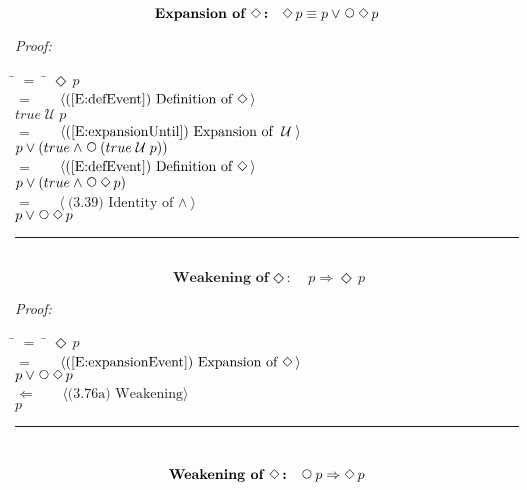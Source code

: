 \documentclass[fleqn, leqno]{article}
\newcommand{\lgap}{2pt} %
\newcommand{\mymathindent}{24pt} %
\newcommand{\Until}{\;\mathcal{U}\;}
\newcommand{\Next}{\;\,\text{\raisebox{3.5pt}{\circle{6}}}}
\newcommand{\Event}{\Diamond\,}
\newcommand{\myqed}{\hfill\rule[-.23ex]{1.2ex}{2.0ex}}
\newcommand{\Gll} {\langle} %
\newcommand{\Ggg} {\rangle} %
\newcommand{\Hint}[1] {\ \ \ $\Gll \mbox{#1} \Ggg$ } %
\begin{document}
\begin{equation}\label{E:expansionEvent}
\textbf{Expansion of $\Event$:}\quad \Event p \equiv p \lor \Next\Event p
\end{equation}

\emph{Proof:}
\begin{tabbing}
\hspace{\mymathindent} \= $= \;$ \= \kill
\> \> $\Event p$\\[\lgap]
\> $=$ \> \Hint{(\ref{E:defEvent}) Definition of $\Event$}\\[\lgap]
\> \> $true \Until p$\\[\lgap]
\> $=$ \> \Hint{(\ref{E:expansionUntil}) Expansion of $\Until$}\\[\lgap]
\> \> $p \lor (true \land \Next(true \Until p))$\\[\lgap]
\> $=$ \> \Hint{(\ref{E:defEvent}) Definition of $\Event$}\\[\lgap]
\> \> $p \lor (true \land \Next\Event p)$\\[\lgap]
\> $=$ \> \Hint{(3.39) Identity of $\land$}\\[\lgap]
\> \> $p \lor \Next\Event p$\\[\lgap]
\end{tabbing}
\myqed\\[\lgap]

\begin{equation}\label{E:impEvent}
\textbf{Weakening of $\Event$:}\quad p \Rightarrow \Event p
\end{equation}

\emph{Proof:}
\begin{tabbing}
\hspace{\mymathindent} \= $= \;$ \= \kill
\> \> $\Event p$\\[\lgap]
\> $=$ \> \Hint{(\ref{E:expansionEvent}) Expansion of $\Event$}\\[\lgap]
\> \> $p \lor \Next\Event p$\\[\lgap]
\> $\Leftarrow$ \> \Hint{(3.76a) Weakening}\\[\lgap]
\> \> $p$\\[\lgap]
\end{tabbing}
\myqed\\[\lgap]


\begin{equation}\label{E:nextEvent}
\textbf{Weakening of $\Event$:}\quad \Next p \Rightarrow \Event p
\end{equation}
\end{document}
